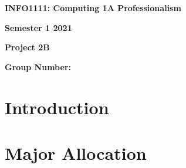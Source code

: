 \documentclass{article}
\begin{document}
\begin{center}
	\begin{huge}
		\textbf{INFO1111: Computing 1A Professionalism}\\
	\end{huge}  
	\vspace{10mm}
	\begin{huge}  
		\textbf{Semester 1 2021}\\  
	\end{huge}
	\vspace{10mm}
	\begin{huge}  
		\textbf{Project 2B}\\  
	\end{huge}
	\vspace{60mm}
	\begin{LARGE}  
		\textbf{Group Number:}\\  
	\end{LARGE}
	\vspace{10mm}
\end{center}
\pagebreak

\section{Introduction}
	\pagebreak
\section{Major Allocation}
	\begin{center}
	\end{center}
\pagebreak
\end{document}
